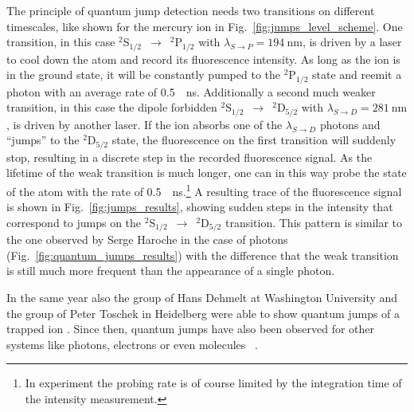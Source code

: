 The principle of quantum jump detection needs two transitions on different
timescales, like shown for the mercury ion in Fig.~\ref{fig:jumps_level_scheme}.
One transition, in this case $^2$S$_{1/2}$~$\rightarrow$~$^2$P$_{1/2}$ with
$\lambda_{S\rightarrow P} = \SI{194}{\nano\meter}$, is driven by a laser to cool
down the atom and record its fluorescence intensity. As long as the ion is in
the ground state, it will be constantly pumped to the $^2$P$_{1/2}$ state and
reemit a photon with an average rate of \SI{0.5}{\per\nano\second}. Additionally
a second much weaker transition, in this case the dipole forbidden
$^2$S$_{1/2}$~$\rightarrow$~$^2$D$_{5/2}$ with $\lambda_{S\rightarrow D} =
\SI{281}{\nano\meter}$, is driven by another laser. If the ion absorbs one of
the $\lambda_{S\rightarrow D}$ photons and ``jumps'' to the $^2$D$_{5/2}$ state,
the fluorescence on the first transition will suddenly stop, resulting in a
discrete step in the recorded fluorescence signal. As the lifetime of the weak
transition is much longer, one can in this way probe the state of the atom with
the rate of \SI{0.5}{\per\nano\second}.\footnote{In experiment the probing rate
is of course limited by the integration time of the intensity measurement.}
A resulting trace of the fluorescence signal is shown in
Fig.~\ref{fig:jumps_results}, showing sudden steps in the intensity that
correspond to jumps on the $^2$S$_{1/2}$~$\rightarrow$~$^2$D$_{5/2}$ transition.
This pattern is similar to the one observed by Serge Haroche in the case of
photons (Fig.~\ref{fig:quantum_jumps_results}) with the difference that the
weak transition is still much more frequent than the appearance of a single
photon.

In the same year also the group of Hans Dehmelt at Washington University and the
group of Peter Toschek in Heidelberg were able to show quantum jumps of a
trapped ion \cite{nagourney1986shelved, sauter1986observation}. Since then,
quantum jumps have also been observed for other systems like photons, electrons or
even molecules ~\cite{haroche2007QuantumJumps, gabrielse1992qnd,
basche1995direct}.

